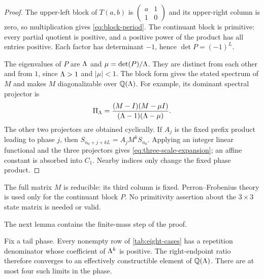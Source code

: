 \begin{proof}
The upper-left block of $T(a,b)$ is
$\left(\begin{smallmatrix}a&1\\1&0\end{smallmatrix}\right)$ and its upper-right
column is zero, so multiplication gives \eqref{eq:block-period}.  The
continuant block is primitive: every partial quotient is positive, and a
positive power of the product has all entries positive.  Each factor has
determinant $-1$, hence $\det P=(-1)^L$.

The eigenvalues of $P$ are $\Lambda$ and
$\mu=\det(P)/\Lambda$.  They are distinct from each other and from $1$, since
$\Lambda>1$ and $|\mu|<1$.  The block form gives the stated spectrum of $M$ and
makes $M$ diagonalizable over $\mathbb{Q}(\Lambda)$.  For example, its dominant spectral
projector is
\[
 \Pi_\Lambda=
 \frac{(M-I)(M-\mu I)}{(\Lambda-1)(\Lambda-\mu)}.
\]
The other two projectors are obtained cyclically.  If $A_j$ is the fixed
prefix product leading to phase $j$, then
$S_{n_0+j+kL}=A_jM^kS_{n_0}$.  Applying an integer linear functional and the
three projectors gives \eqref{eq:three-scale-expansion}; an affine constant is
absorbed into $C_1$.  Nearby indices only change the fixed phase product.
\end{proof}

\begin{remark}
\label{rem:not-primitive}
The full matrix $M$ is reducible: its third column is fixed.  Perron--Frobenius
theory is used only for the continuant block $P$.  No primitivity assertion
about the $3\times3$ state matrix is needed or valid.
\end{remark}

The next lemma contains the finite-mass step of the proof.

\begin{lemma}
\label{lem:four-per-phase}
Fix a tail phase.  Every nonempty row of \cref{tab:eight-cases} has a
repetition denominator whose coefficient of $\Lambda^k$ is positive.  The
right-endpoint ratio therefore converges to an effectively constructible
element of $\mathbb{Q}(\Lambda)$.  There are at most four such limits in the phase.
\end{lemma}

